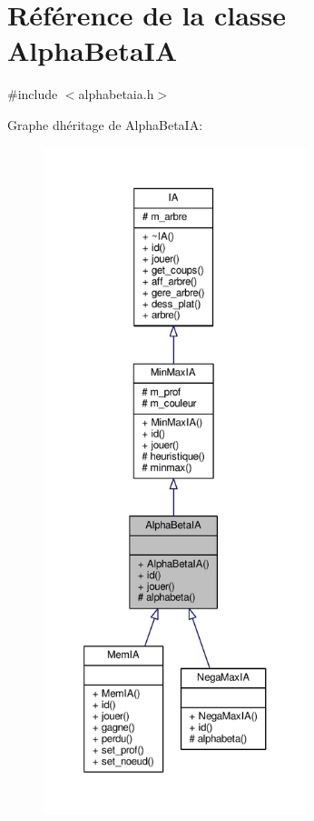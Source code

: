 \hypertarget{classAlphaBetaIA}{}\section{Référence de la classe Alpha\+Beta\+IA}
\label{classAlphaBetaIA}


{\ttfamily \#include $<$alphabetaia.\+h$>$}



Graphe d\textquotesingle{}héritage de Alpha\+Beta\+IA\+:\nopagebreak
\begin{figure}[H]
\begin{center}
\leavevmode
\includegraphics[height=550pt]{classAlphaBetaIA__inherit__graph}
\end{center}
\end{figure}


